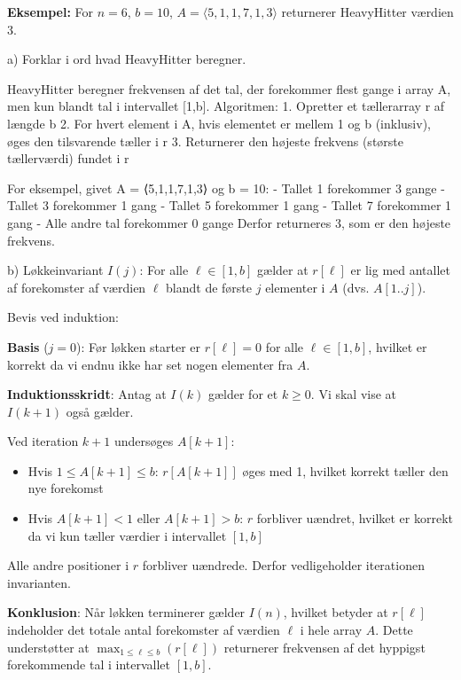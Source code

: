 \documentclass{article}
\theoremstyle{definition}
\begin{document}
\textbf{Eksempel:} For $n = 6$, $b = 10$, $A = \langle 5,1,1,7,1,3 \rangle$ returnerer HeavyHitter værdien 3.

a) Forklar i ord hvad HeavyHitter beregner. 

HeavyHitter beregner frekvensen af det tal, der forekommer flest gange i array A, men kun blandt tal i intervallet [1,b]. Algoritmen:
1. Opretter et tællerarray r af længde b
2. For hvert element i A, hvis elementet er mellem 1 og b (inklusiv), øges den tilsvarende tæller i r
3. Returnerer den højeste frekvens (største tællerværdi) fundet i r

For eksempel, givet A = ⟨5,1,1,7,1,3⟩ og b = 10:
- Tallet 1 forekommer 3 gange
- Tallet 3 forekommer 1 gang
- Tallet 5 forekommer 1 gang
- Tallet 7 forekommer 1 gang
- Alle andre tal forekommer 0 gange
Derfor returneres 3, som er den højeste frekvens.

b) Løkkeinvariant $I(j)$: For alle $\ell \in [1,b]$ gælder at $r[\ell]$ er lig med antallet af forekomster af værdien $\ell$ blandt de første $j$ elementer i $A$ (dvs. $A[1..j]$).

Bevis ved induktion:

\textbf{Basis} ($j = 0$):
Før løkken starter er $r[\ell] = 0$ for alle $\ell \in [1,b]$, hvilket er korrekt da vi endnu ikke har set nogen elementer fra $A$.

\textbf{Induktionsskridt}:
Antag at $I(k)$ gælder for et $k \geq 0$. Vi skal vise at $I(k+1)$ også gælder.

Ved iteration $k+1$ undersøges $A[k+1]$:
\begin{itemize}
    \item Hvis $1 \leq A[k+1] \leq b$: $r[A[k+1]]$ øges med 1, hvilket korrekt tæller den nye forekomst
    \item Hvis $A[k+1] < 1$ eller $A[k+1] > b$: $r$ forbliver uændret, hvilket er korrekt da vi kun tæller værdier i intervallet $[1,b]$
\end{itemize}

Alle andre positioner i $r$ forbliver uændrede. Derfor vedligeholder iterationen invarianten.

\textbf{Konklusion}:
Når løkken terminerer gælder $I(n)$, hvilket betyder at $r[\ell]$ indeholder det totale antal forekomster af værdien $\ell$ i hele array $A$. Dette understøtter at $\max_{1 \leq \ell \leq b}(r[\ell])$ returnerer frekvensen af det hyppigst forekommende tal i intervallet $[1,b]$.
\end{document}
